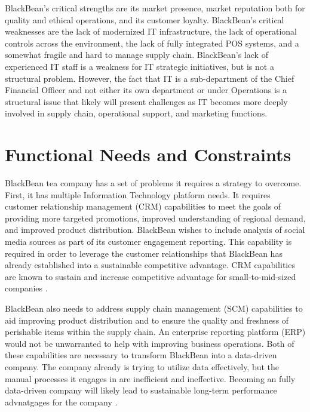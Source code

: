 BlackBean's critical strengths are its market presence, market reputation both for quality and ethical operations, and its customer loyalty. BlackBean's critical weaknesses are the lack of modernized IT infrastructure, the lack of operational controls across the environment, the lack of fully integrated POS systems, and a somewhat fragile and hard to manage supply chain. BlackBean's lack of experienced IT staff is a weakness for IT strategic initiatives, but is not a structural problem. However, the fact that IT is a sub-department of the Chief Financial Officer and not either its own department or under Operations is a structural issue that likely will present challenges as IT becomes more deeply involved in supply chain, operational support, and marketing functions.



\section{Functional Needs and Constraints}

BlackBean tea company has a set of problems it requires a strategy to overcome. First, it has multiple Information Technology platform needs. It requires customer relationship management (CRM) capabilities to meet the goals of providing more targeted promotions, improved understanding of regional demand, and improved product distribution. BlackBean wishes to include analysis of social media sources as part of its customer engagement reporting. This capability is required in order to leverage the customer relationships that BlackBean has already established into a sustainable competitive advantage. CRM capabilities are known to sustain and increase competitive advantage for small-to-mid-sized companies \parencite{pohludkaBestPracticeCRM2019}.

BlackBean also needs to address supply chain management (SCM) capabilities to aid improving product distribution and to ensure the quality and freshness of perishable items within the supply chain. An enterprise reporting platform (ERP) would not be unwarranted to help with improving business operations. Both of these capabilities are necessary to transform BlackBean into a data-driven company. The company already is trying to utilize data effectively, but the manual processes it engages in are inefficient and ineffective. Becoming an fully data-driven company will likely lead to sustainable long-term performance advnatgages for the company \parencite{ajimokoConsiderationsAdoptionCloud2018}.

